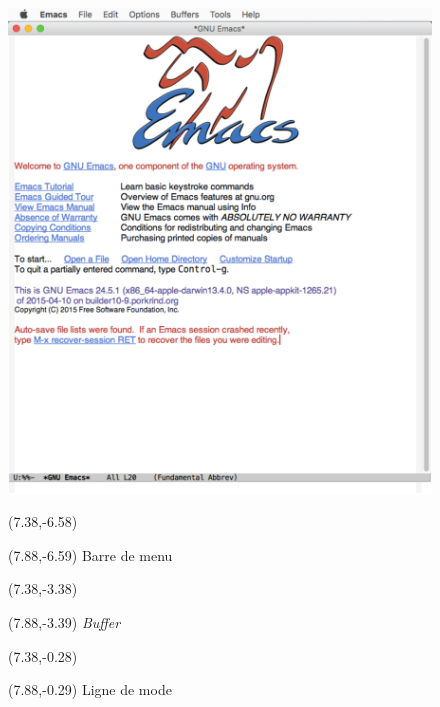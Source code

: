 \begin{figure}[t]
  \includegraphics{emacswindow-screenshot}

  \begin{textblock}{0.35}(7.38,-6.58)
    \Large\faLongArrowRight
  \end{textblock}
  \begin{textblock}{1.75}(7.88,-6.59)
    \footnotesize\sffamily Barre de menu
  \end{textblock}

  \begin{textblock}{0.35}(7.38,-3.38)
    \Large\faLongArrowRight
  \end{textblock}
  \begin{textblock}{1.75}(7.88,-3.39)
    \footnotesize\sffamily \emph{Buffer}
  \end{textblock}

  \begin{textblock}{0.35}(7.38,-0.28)
    \Large\faLongArrowRight
  \end{textblock}
  \begin{textblock}{1.75}(7.88,-0.29)
    \footnotesize\sffamily Ligne de mode
  \end{textblock}


\end{figure}
